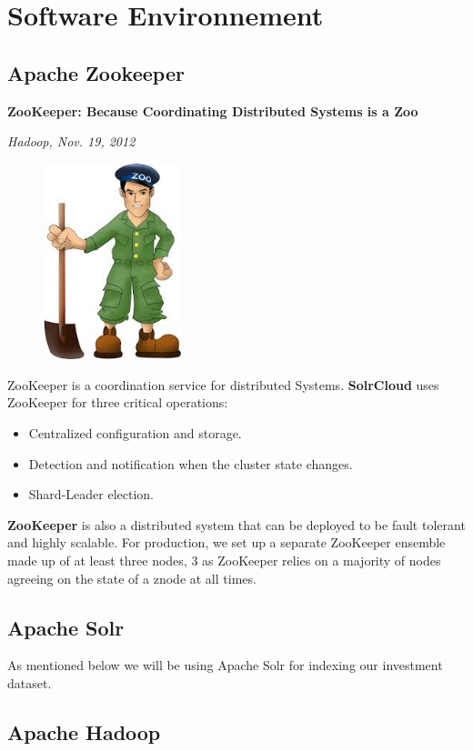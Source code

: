 \clearpage

\section{Software Environnement}
\subsection{Apache Zookeeper}
\epigraph{\textbf{ZooKeeper: Because Coordinating Distributed Systems is a Zoo}}{\textit{Hadoop, Nov. 19, 2012}}

\begin{figure}
    \includegraphics[width=4cm]{images/zookeeper.jpeg}
    \end{figure}
ZooKeeper is a coordination service for distributed Systems. \textbf{SolrCloud} uses ZooKeeper for three 
critical operations:
\begin{itemize}
    \item Centralized configuration and storage.
    \item Detection and notification when the cluster state changes.
    \item Shard-Leader election. 
\end{itemize}  
\textbf{ZooKeeper} is also a distributed system that can be deployed to be fault tolerant and highly
scalable. For production, we set up a separate ZooKeeper ensemble made up of at
least three nodes, 3 as ZooKeeper relies on a majority of nodes agreeing on the state of a znode at all times.
\bigbreak
\bigbreak
\bigbreak
\bigbreak
\bigbreak
\bigbreak

\subsection{Apache Solr}
As mentioned below we will be using Apache Solr for indexing our investment dataset.
\subsection{Apache Hadoop}

